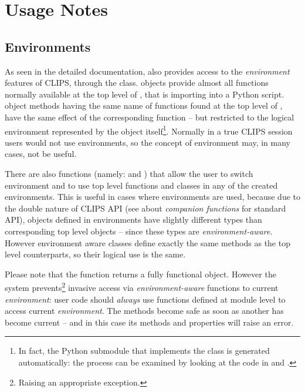 \appendix

\chapter{Usage Notes\label{pyclips-unotes}}

\section{Environments\label{pyclips-unotes-env}}

As seen in the detailed documentation, \pyclips{} also provides access
to the \emph{environment} features of CLIPS, through the
 class.  objects provide almost
all functions normally available at the top level of \pyclips{}, that is
importing  into a Python script.  object
methods having the same name of functions found at the top level of
\pyclips{}, have the same effect of the corresponding function -- but
restricted to the logical environment represented by the object
itself\footnote{In fact, the Python submodule that implements the
 class is generated automatically: the process can be
examined by looking at the code in  and
.}. Normally in a true CLIPS session users would
not use environments, so the concept of environment may, in many cases,
not be useful.

There are also functions (namely:  and
) that allow the user to switch
environment and to use top level functions and classes in any of the
created environments. This is useful in cases where environments are used,
because due to the double nature of CLIPS API (see \clipsapg{} about
\emph{companion functions} for standard API), objects defined in
environments have slightly different types than corresponding top level
objects -- since these types are \emph{environment-aware}. However
environment aware classes define exactly the same methods as the top
level counterparts, so their logical use is the same.

\begin{notice}
Please note that the  function returns
a fully functional  object. However the system
prevents\footnote{Raising an appropriate exception.} invasive access via
\emph{environment-aware} functions to current \emph{environment}: user
code should \emph{always} use functions defined at module level to access
current \emph{environment}. The  methods become safe
as soon as another  has become current -- and in this
case its methods and properties will raise an error.
\end{notice}

